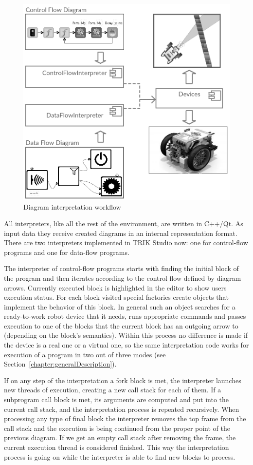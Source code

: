 \documentclass[conference]{IEEEtran}
\begin{document}
\begin{figure}[ht]
    \includegraphics[width=0.9\columnwidth]{TS_Interpreter_Architecture.png}
    \caption{Diagram interpretation workflow}
    \label{image:interpretersTSArch}
\end{figure}

All interpreters, like all the rest of the environment, are written in C++/Qt. As input data they receive created diagrams in an internal representation format. There are two interpreters implemented in TRIK Studio now: one for control-flow programs and one for data-flow programs.

The interpreter of control-flow programs starts with finding the initial block of the program and then iterates according to the control flow defined by diagram arrows. Currently executed block is highlighted in the editor to show users execution status. For each block visited special factories create objects that implement the behavior of this block. In general such an object searches for a ready-to-work robot device that it needs, runs appropriate commands and passes execution to one of the blocks that the current block has an outgoing arrow to (depending on the block's semantics). Within this process no difference is made if the device is a real one or a virtual one, so the same interpretation code works for execution of a program in two out of three modes (see Section~\ref{chapter:generalDescription}).

If on any step of the interpretation a fork block is met, the interpreter launches new threads of execution, creating a new call stack for each of them. If a subprogram call block is met, its arguments are computed and put into the current call stack, and the interpretation process is repeated recursively. When processing any type of final block the interpreter removes the top frame from the call stack and the execution is being continued from the proper point of the previous diagram. If we get an empty call stack after removing the frame, the current execution thread is considered finished. This way the interpretation process is going on while the interpreter is able to find new blocks to process.
\end{document}
